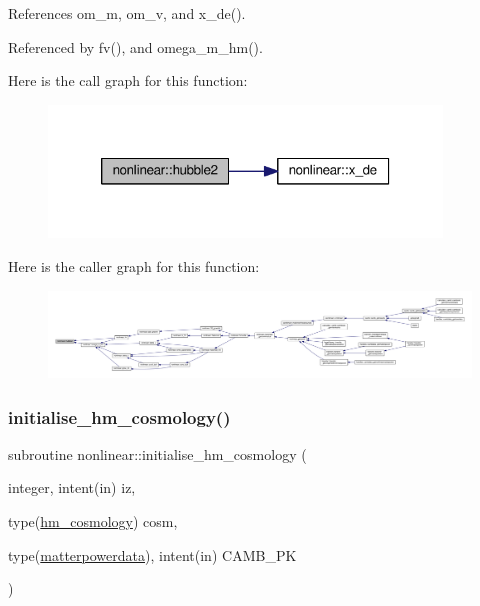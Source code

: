 References om\+\_\+m, om\+\_\+v, and x\+\_\+de().



Referenced by fv(), and omega\+\_\+m\+\_\+hm().

Here is the call graph for this function\+:
\nopagebreak
\begin{figure}[H]
\begin{center}
\leavevmode
\includegraphics[width=296pt]{namespacenonlinear_a82f340c9a9b18e3f45b2ddbe518cebba_cgraph}
\end{center}
\end{figure}
Here is the caller graph for this function\+:
\nopagebreak
\begin{figure}[H]
\begin{center}
\leavevmode
\includegraphics[width=350pt]{namespacenonlinear_a82f340c9a9b18e3f45b2ddbe518cebba_icgraph}
\end{center}
\end{figure}
\mbox{\label{namespacenonlinear_a819e3b1efc1572f5e75eb5f2b415b4b4}} 
\subsubsection{\texorpdfstring{initialise\+\_\+hm\+\_\+cosmology()}{initialise\_hm\_cosmology()}}
{\footnotesize\ttfamily subroutine nonlinear\+::initialise\+\_\+hm\+\_\+cosmology (\begin{DoxyParamCaption}\item[{integer, intent(in)}]{iz,  }\item[{type(\mbox{\hyperlink{structnonlinear_1_1hm__cosmology}{hm\+\_\+cosmology}})}]{cosm,  }\item[{type(\mbox{\hyperlink{structtransfer_1_1matterpowerdata}{matterpowerdata}}), intent(in)}]{C\+A\+M\+B\+\_\+\+PK }\end{DoxyParamCaption})\hspace{0.3cm}{\ttfamily [private]}}



